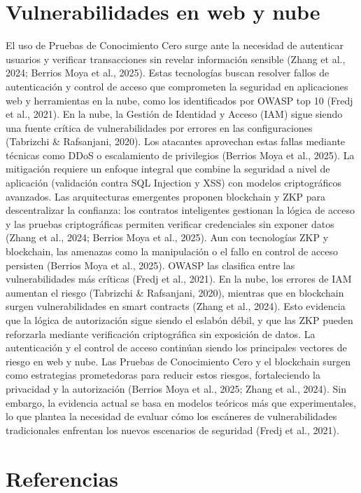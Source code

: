 \documentclass[conference]{IEEEtran}
\begin{document}
\section{Vulnerabilidades en web y nube}
El uso de Pruebas de Conocimiento Cero  surge ante la necesidad de autenticar usuarios y verificar transacciones sin revelar información sensible (Zhang et al., 2024; Berrios Moya et al., 2025). Estas tecnologías buscan resolver fallos de autenticación y control de acceso que comprometen la seguridad en aplicaciones web y herramientas en la nube, como los identificados por OWASP top 10 (Fredj et al., 2021).
En la nube, la Gestión de Identidad y Acceso (IAM) sigue siendo una fuente crítica de vulnerabilidades por errores en las configuraciones (Tabrizchi & Rafsanjani, 2020). Los atacantes aprovechan estas fallas mediante técnicas como DDoS o escalamiento de privilegios (Berrios Moya et al., 2025). La mitigación requiere un enfoque integral que combine la seguridad a nivel de aplicación (validación contra SQL Injection y XSS) con modelos criptográficos avanzados.
Las arquitecturas emergentes proponen blockchain y ZKP para descentralizar la confianza: los contratos inteligentes gestionan la lógica de acceso y las pruebas criptográficas permiten verificar credenciales sin exponer datos (Zhang et al., 2024; Berrios Moya et al., 2025).
Aun con tecnologías ZKP y blockchain, las amenazas como la manipulación o el fallo en control de acceso persisten (Berrios Moya et al., 2025). OWASP las clasifica entre las vulnerabilidades más críticas (Fredj et al., 2021). En la nube, los errores de IAM aumentan el riesgo (Tabrizchi & Rafsanjani, 2020), mientras que en blockchain surgen vulnerabilidades en smart contracts (Zhang et al., 2024). Esto evidencia que la lógica de autorización sigue siendo el eslabón débil, y que las ZKP pueden reforzarla mediante verificación criptográfica sin exposición de datos.
La autenticación y el control de acceso continúan siendo los principales vectores de riesgo en web y nube. Las Pruebas de Conocimiento Cero y el blockchain surgen como estrategias prometedoras para reducir estos riesgos, fortaleciendo la privacidad y la autorización (Berrios Moya et al., 2025; Zhang et al., 2024). Sin embargo, la evidencia actual se basa en modelos teóricos más que experimentales, lo que plantea la necesidad de evaluar cómo los escáneres de vulnerabilidades tradicionales enfrentan los nuevos escenarios de seguridad (Fredj et al., 2021).



\section*{Referencias}
\end{document}
